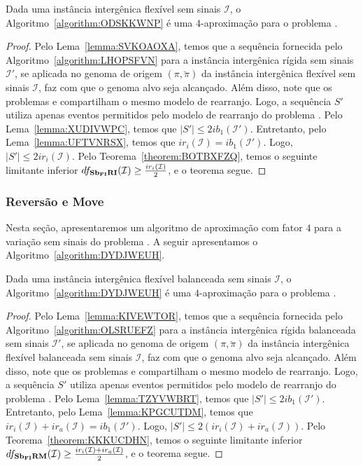 \begin{theorem}\label{theorem:LXPAWAPW}
Dada uma instância intergênica flexível sem sinais $\mathcal{I}$, o Algoritmo~\ref{algorithm:ODSKKWNP} é uma $4$-aproximação para o problema \SbFIRI{}.
\end{theorem}
\begin{proof}
Pelo Lema~\ref{lemma:SVKOAOXA}, temos que a sequência fornecida pelo Algoritmo~\ref{algorithm:LHOPSFVN} para a instância intergênica rígida sem sinais $\mathcal{I'}$, se aplicada no genoma de origem $(\pi,\breve\pi)$ da instância intergênica flexível sem sinais $\mathcal{I}$, faz com que o genoma alvo seja alcançado. Além disso, note que os problemas \SbIRI{} e \SbFIRI{} compartilham o mesmo modelo de rearranjo. Logo, a sequência $S'$ utiliza apenas eventos permitidos pelo modelo de rearranjo do problema \SbFIRI{}. Pelo Lema~\ref{lemma:XUDIVWPC}, temos que $|S'| \le 2ib_1(\mathcal{I'})$. Entretanto, pelo Lema~\ref{lemma:UFTVNRSX}, temos que $ir_i(\mathcal{I}) = ib_1(\mathcal{I'})$. Logo, $|S'| \le 2ir_i(\mathcal{I})$. Pelo Teorema~\ref{theorem:BOTBXFZQ}, temos o seguinte limitante inferior $df_{\textbf{Sb\textsubscript{FI}RI}}(\mathcal{I}) \ge \frac{ir_i(\mathcal{I})}{2}$, e o teorema segue.
\end{proof}

\subsubsection{Reversão e Move}

Nesta seção, apresentaremos um algoritmo de aproximação com fator $4$ para a variação sem sinais do problema \SbFIRM{}. A seguir apresentamos o Algoritmo~\ref{algorithm:DYDJWEUH}.



\begin{theorem}\label{theorem:MALFMHVQ}
Dada uma instância intergênica flexível balanceada sem sinais $\mathcal{I}$, o Algoritmo~\ref{algorithm:DYDJWEUH} é uma $4$-aproximação para o problema \SbFIRM{}.
\end{theorem}
\begin{proof}
Pelo Lema~\ref{lemma:KIVEWTOR}, temos que a sequência fornecida pelo Algoritmo~\ref{algorithm:OLSRUEFZ} para a instância intergênica rígida balanceada sem sinais $\mathcal{I'}$, se aplicada no genoma de origem $(\pi,\breve\pi)$ da instância intergênica flexível balanceada sem sinais $\mathcal{I}$, faz com que o genoma alvo seja alcançado. Além disso, note que os problemas \SbIRM{} e \SbFIRM{} compartilham o mesmo modelo de rearranjo. Logo, a sequência $S'$ utiliza apenas eventos permitidos pelo modelo de rearranjo do problema \SbFIRM{}. Pelo Lema~\ref{lemma:TZYVWBRT}, temos que $|S'| \le 2ib_1(\mathcal{I'})$. Entretanto, pelo Lema~\ref{lemma:KPGCUTDM}, temos que $ir_i(\mathcal{I}) + ir_a(\mathcal{I}) = ib_1(\mathcal{I'})$. Logo, $|S'| \le 2(ir_i(\mathcal{I}) + ir_a(\mathcal{I}))$. Pelo Teorema~\ref{theorem:KKKUCDHN}, temos o seguinte limitante inferior $df_{\textbf{Sb\textsubscript{FI}RM}}(\mathcal{I}) \ge \frac{ir_i(\mathcal{I}) + ir_a(\mathcal{I})}{2}$, e o teorema segue.
\end{proof}

